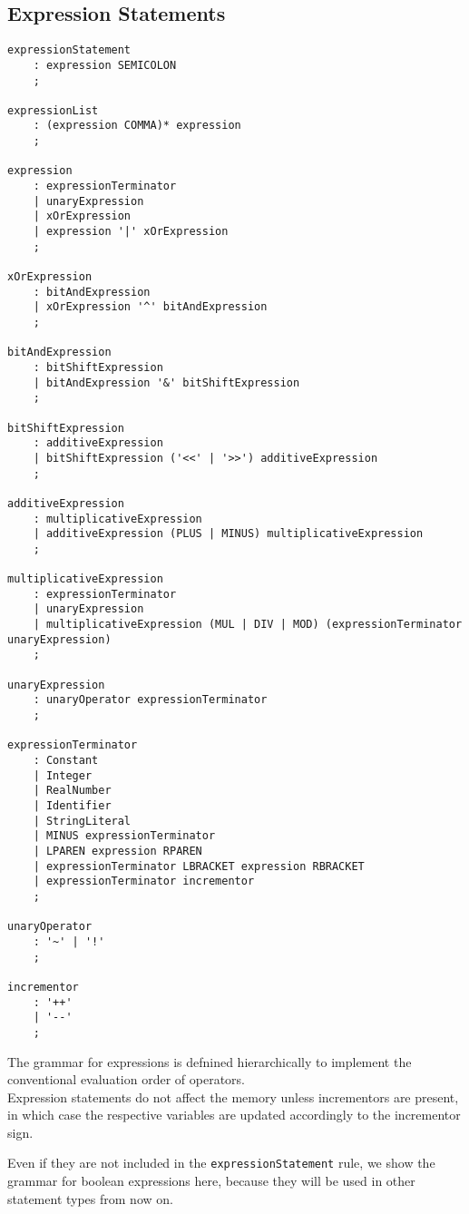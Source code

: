 \documentclass[12pt,a4paper]{report}
\theoremstyle{definition}
\theoremstyle{definition}
\theoremstyle{definition}
\begin{document}
\subsection{Expression Statements}
\begin{lstlisting}
expressionStatement
    : expression SEMICOLON
    ;
    
expressionList
    : (expression COMMA)* expression
    ;

expression
    : expressionTerminator
    | unaryExpression
    | xOrExpression
    | expression '|' xOrExpression
    ;

xOrExpression
    : bitAndExpression
    | xOrExpression '^' bitAndExpression
    ;

bitAndExpression
    : bitShiftExpression
    | bitAndExpression '&' bitShiftExpression
    ;

bitShiftExpression
    : additiveExpression
    | bitShiftExpression ('<<' | '>>') additiveExpression
    ;

additiveExpression
    : multiplicativeExpression
    | additiveExpression (PLUS | MINUS) multiplicativeExpression
    ;

multiplicativeExpression
    : expressionTerminator
    | unaryExpression
    | multiplicativeExpression (MUL | DIV | MOD) (expressionTerminator unaryExpression)
    ;

unaryExpression
    : unaryOperator expressionTerminator
    ;

expressionTerminator
    : Constant
    | Integer
    | RealNumber
    | Identifier
    | StringLiteral
    | MINUS expressionTerminator
    | LPAREN expression RPAREN
    | expressionTerminator LBRACKET expression RBRACKET
    | expressionTerminator incrementor
    ;

unaryOperator
    : '~' | '!'
    ;

incrementor
    : '++'
    | '--'
    ;
\end{lstlisting}

The grammar for expressions is defnined hierarchically to implement the conventional evaluation order of operators.\\
Expression statements do not affect the memory unless incrementors are present, in which case the respective variables are updated accordingly to the incrementor sign.

Even if they are not included in the \texttt{expressionStatement} rule, we show the grammar for boolean expressions here, because they will be used in other statement types from now on.
\end{document}
